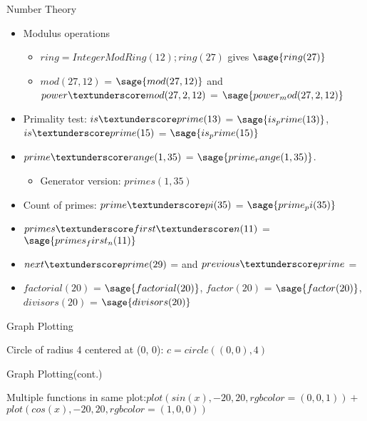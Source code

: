 \documentclass{beamer}
\begin{document}
\begin{frame}{Number Theory}
 \begin{itemize}
  \item Modulus operations
  \begin{itemize}
   \item $ring = IntegerModRing(12); ring(27)$ gives $\sage{ring(27)}$
   \item $mod(27, 12)$ = $\sage{mod(27, 12)}$ and $power \textunderscore mod(27, 2, 12)$ = $\sage{power_mod(27, 2, 12)}$
  \end{itemize}
  \item Primality test: $is \textunderscore prime(13)$ = $\sage{is_prime(13)}$, $is \textunderscore prime(15)$ = $\sage{is_prime(15)}$
  \item $prime \textunderscore range(1, 35)$ = $\sage{prime_range(1, 35)}$.
  \begin{itemize}
    \item Generator version: $primes(1, 35)$
  \end{itemize}
  \item Count of primes: $prime \textunderscore pi(35)$ = $\sage{prime_pi(35)}$
  \item $primes \textunderscore first \textunderscore n(11)$ = $\sage{primes_first_n(11)}$
  \item $next \textunderscore prime(29)$ =  and $previous \textunderscore prime$ = 
  \item $factorial(20)$ = $\sage{factorial(20)}$, $factor(20)$ = $\sage{factor(20)}$, $divisors(20)$  = $\sage{divisors(20)}$
 \end{itemize}
\end{frame}

\begin{frame}{Graph Plotting}
  \begin{center}
    Circle of radius 4 centered at (0, 0): $c = circle((0, 0), 4)$
  \end{center}
\end{frame}

\begin{frame}{Graph Plotting(cont.)}
  \begin{center}
    Multiple functions in same plot:$plot(sin(x), -20, 20, rgbcolor = (0, 0, 1)) +$ \\ $plot(cos(x), -20, 20, rgbcolor = (1, 0, 0))$
  \end{center}
\end{frame}
\end{document}
